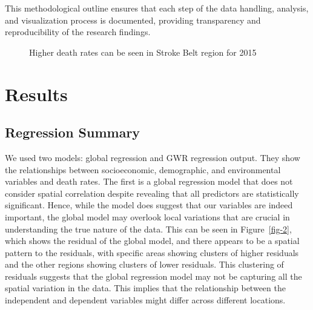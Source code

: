 \documentclass[
]{article}
\begin{document}
This methodological outline ensures that each step of the data handling,
analysis, and visualization process is documented, providing
transparency and reproducibility of the research findings.

\begin{figure}[!ht]


\caption{\label{fig-1}Higher death rates can be seen in Stroke Belt
region for 2015}

\end{figure}%

\section{Results}\label{results}

\subsection{Regression Summary}\label{regression-summary}

We used two models: global regression and GWR regression output. They
show the relationships between socioeconomic, demographic, and
environmental variables and death rates. The first is a global
regression model that does not consider spatial correlation despite
revealing that all predictors are statistically significant. Hence,
while the model does suggest that our variables are indeed important,
the global model may overlook local variations that are crucial in
understanding the true nature of the data. This can be seen in
Figure~\ref{fig-2}, which shows the residual of the global model, and
there appears to be a spatial pattern to the residuals, with specific
areas showing clusters of higher residuals and the other regions showing
clusters of lower residuals. This clustering of residuals suggests that
the global regression model may not be capturing all the spatial
variation in the data. This implies that the relationship between the
independent and dependent variables might differ across different
locations.
\end{document}
